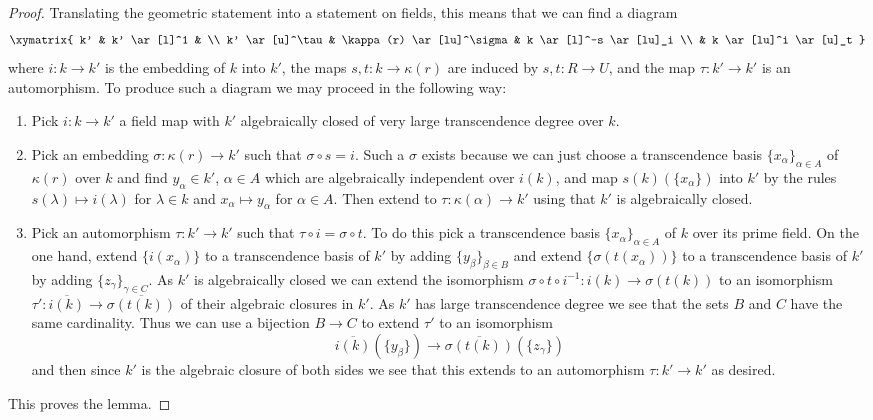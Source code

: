 \begin{proof}
Translating the geometric statement into a statement on fields,
this means that we can find a diagram
$$
\xymatrix{
k' & k' \ar[l]^1 & \\
k' \ar[u]^\tau & \kappa(r) \ar[lu]^\sigma & k \ar[l]^-s \ar[lu]_i \\
& k \ar[lu]^i \ar[u]_t
}
$$
where $i : k \to k'$ is the embedding of $k$ into $k'$,
the maps $s, t : k \to \kappa(r)$ are induced by $s, t : R \to U$, and
the map $\tau : k' \to k'$ is an automorphism. To produce such
a diagram we may proceed in the following way:
\begin{enumerate}
\item Pick $i : k \to k'$ a field map with $k'$ algebraically closed of
very large transcendence degree over $k$.
\item Pick an embedding $\sigma : \kappa(r) \to k'$ such that
$\sigma \circ s = i$. Such a $\sigma$ exists because we can just
choose a transcendence basis $\{x_\alpha\}_{\alpha \in A}$ of $\kappa(r)$
over $k$ and find $y_\alpha \in k'$, $\alpha \in A$ which are algebraically
independent over $i(k)$, and map $s(k)(\{x_\alpha\})$ into $k'$ by
the rules $s(\lambda) \mapsto i(\lambda)$ for $\lambda \in k$
and $x_\alpha \mapsto y_\alpha$ for $\alpha \in A$.
Then extend to $\tau : \kappa(\alpha) \to k'$ using that $k'$ is
algebraically closed.
\item Pick an automorphism $\tau : k' \to k'$ such that
$\tau \circ i = \sigma \circ t$. To do this pick a transcendence
basis $\{x_\alpha\}_{\alpha \in A}$ of $k$ over its prime field.
On the one hand, extend $\{i(x_\alpha)\}$ to a transcendence basis of
$k'$ by adding $\{y_\beta\}_{\beta \in B}$ and extend
$\{\sigma(t(x_\alpha))\}$ to a transcendence basis of $k'$ by adding
$\{z_\gamma\}_{\gamma \in C}$.
As $k'$ is algebraically closed we can extend the isomorphism
$\sigma \circ t \circ i^{-1} : i(k) \to \sigma(t(k))$
to an isomorphism $\tau' : \overline{i(k)} \to \overline{\sigma(t(k))}$
of their algebraic closures in $k'$.
As $k'$ has large transcendence degree
we see that the sets $B$ and $C$ have the same cardinality.
Thus we can use a bijection
$B \to C$ to extend $\tau'$ to an isomorphism
$$
\overline{i(k)}(\{y_\beta\})
\longrightarrow
\overline{\sigma(t(k))}(\{z_\gamma\})
$$
and then since $k'$ is the algebraic closure of both sides we
see that this extends to an automorphism $\tau : k' \to k'$
as desired.
\end{enumerate}
This proves the lemma.
\end{proof}

